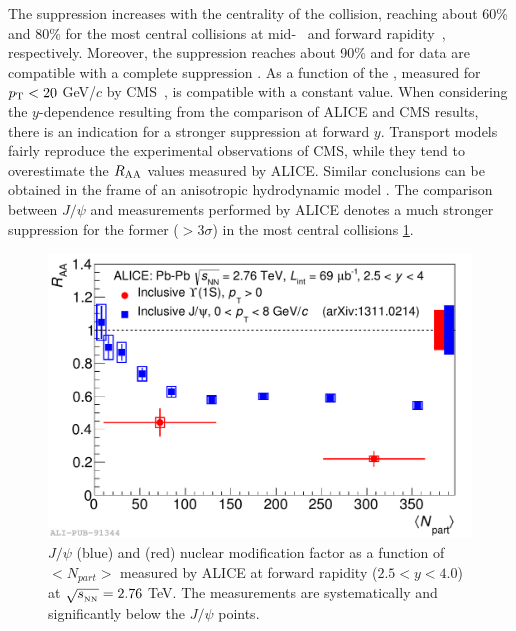 The suppression increases with the centrality of the collision, reaching about 60\% and 80\% for the most central collisions at mid-~\cite{Khachatryan:2016xxp} and forward rapidity~\cite{Abelev:2014nua}, respectively. 
Moreover, the \upsiss suppression reaches about 90\% and for \upsisss data are compatible with a complete suppression \cite{Khachatryan:2016xxp}. 
As a function of \pt the \upsis \raa, measured for $p_{\rm T}<20$ GeV/$c$ by CMS~\cite{Khachatryan:2016xxp}, is compatible with a constant value. 
When considering the $y$-dependence resulting from the comparison of ALICE and CMS results, there is an indication for a stronger suppression at forward $y$.
Transport models \cite{Zhou:2014kka,Du:2017qkv} fairly reproduce the experimental observations of CMS, while they tend to overestimate the $R_{\rm AA}$ values measured by ALICE. 
Similar conclusions can be obtained in the frame of an anisotropic hydrodynamic model \cite{Krouppa:2017jlg}. 
The comparison between $J/\psi$ and \upsis measurements performed by ALICE denotes a much stronger suppression for the former ($>3\sigma$) in the most central collisions \ref{fig:ALICE_jpsi_upsi}.

\begin{figure}[!t]
\begin{center}
\includegraphics[width=0.8\linewidth]{Chapters/Analysis/Figs/2014-Dec-16-Raa_Jpsi_centr.pdf}
\caption{$J/\psi$ (blue) and \upsis (red) nuclear modification factor as a function of $<N_{part}>$ measured by ALICE at forward rapidity ($2.5<y<4.0$) at $\sqrt{s_{_{\rm NN}}}=2.76$ \rm{TeV}. The \upsis measurements are systematically and significantly below the $J/\psi$ points.}
\label{fig:ALICE_jpsi_upsi}
\end{center}
\end{figure}

